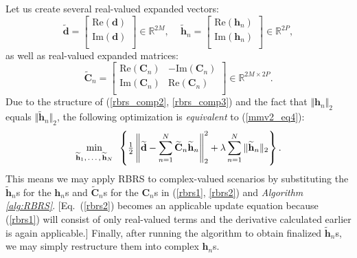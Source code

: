 \documentclass[final]{siamltex}
\newcommand{\field}[1]{\mathbb{#1}}
\newcommand{\la}[1]{\mbox{$\mathbf{#1}$}}  \newcommand{\sst}[1]{\mbox{\scriptsize{#1}}}
\begin{document}
   Let us create several real-valued expanded vectors:
   \begin{equation}\label{rbrs_comp2}
     \widetilde{\la{d}}   = \left [  \begin{array}{c}
                                     \mbox{Re}(\la{d}) \\ 
                                     \mbox{Im}(\la{d}) \\
                                     \end{array} \right ] \in \field{R}^{2M}, \mbox{ }\,\,\,
     \widetilde{\la{h}}_n  = \left [  \begin{array}{c}
                                     \mbox{Re}(\la{h}_n) \\ 
                                     \mbox{Im}(\la{h}_n) \\
                                     \end{array} \right ] \in \field{R}^{2P},
   \end{equation}
   as well as real-valued expanded matrices:
   \begin{equation}\label{rbrs_comp3}
      \widetilde{\la{C}}_n = \left[ \begin{array}{cc}
                                    \mbox{Re}(\la{C}_n) & -\mbox{Im}(\la{C}_n) \\
                                    \mbox{Im}(\la{C}_n) &  \mbox{Re}(\la{C}_n) \\
                                    \end{array} \right ] \in \field{R}^{2M \times 2P}.
   \end{equation}
   Due to the structure of (\ref{rbrs_comp2}, \ref{rbrs_comp3}) and the fact
   that $\Vert \la{h}_n \Vert_2$ equals $\Vert \widetilde{\la{h}}_n
   \Vert_2$, the following optimization is {\em{equivalent}} to
   (\ref{mmv2_eq4}):
   \begin{equation}\label{rbrs_comp4}
      \mathop{\mbox{min}}_{\mbox{\scriptsize{$\widetilde{\la{h}}_1, \ldots, \widetilde{\la{h}}_N$}}} 
      \mbox{  }
      \left \{
        \tfrac{1}{2}  \left \Vert \widetilde{\la{d}} -
                      \sum_{n=1}^N \widetilde{\la{C}}_n
                      \widetilde{\la{h}}_n
                      \right \Vert_2^2
       +     \lambda  \sum_{n=1}^{N} \Vert \widetilde{\la{h}}_n \Vert_2
      \right \}.
   \end{equation}
   This means we may apply RBRS to complex-valued scenarios by
   substituting the $\widetilde{\la{h}}_n$s for the $\la{h}_n$s and
   $\widetilde{\la{C}}_n$s for the $\la{C}_n$s in (\ref{rbrs1},
   \ref{rbrs2}) and {\em{Algorithm \ref{alg:RBRS}}}.  [Eq.~(\ref{rbrs2})
   becomes an applicable update equation because (\ref{rbrs1}) will
   consist of only real-valued terms and the derivative calculated
   earlier is again applicable.]  Finally, after running the algorithm to
   obtain finalized $\widetilde{\la{h}}_n$s, we may simply restructure
   them into complex $\la{h}_n$s.
\end{document}
